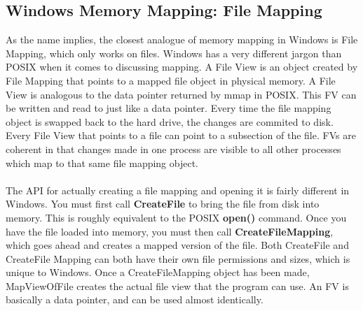 \documentclass[11pt]{article}
\begin{document}
\subsection{Windows Memory Mapping: File Mapping}
As the name implies, the closest analogue of memory mapping in Windows is File Mapping, which only works on files. Windows has a very different jargon than POSIX when it comes to discussing mapping. A File View is an object created by File Mapping that points to a mapped file object in physical memory. A File View is analogous to the data pointer returned by mmap in POSIX. This FV can be written and read to just like a data pointer. Every time the file mapping object is swapped back to the hard drive, the changes are commited to disk. Every File View that points to a file can point to a subsection of the file. FVs are coherent in that changes made in one process are visible to all other processes which map to that same file mapping object. \\ \\
The API for actually creating a file mapping and opening it is fairly different in Windows. You must first call \textbf{CreateFile} to bring the file from disk into memory. This is roughly equivalent to the POSIX \textbf{open()} command. Once you have the file loaded into memory, you must then call \textbf{CreateFileMapping}, which goes ahead and creates a mapped version of the file. Both CreateFile and CreateFile Mapping can both have their own file permissions and sizes, which is unique to Windows. Once a CreateFileMapping object has been made, MapViewOfFile creates the actual file view that the program can use. An FV is basically a data pointer, and can be used almost identically. 
\end{document}
